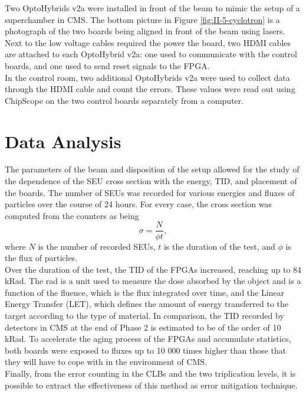     Two OptoHybrids v2a were installed in front of the beam to mimic the setup of a superchamber in CMS. The bottom picture in Figure \ref{fig:II-5-cyclotron} is a photograph of the two boards being aligned in front of the beam using lasers. Next to the low voltage cables required the power the board, two HDMI cables are attached to each OptoHybrid v2a: one used to communicate with the control boards, and one used to send reset signals to the FPGA. \\

    In the control room, two additional OptoHybrids v2a were used to collect data through the HDMI cable and count the errors. These values were read out using ChipScope on the two control boards separately from a computer.

  \section{Data Analysis}

    The parameters of the beam and disposition of the setup allowed for the study of the dependence of the SEU cross section with the energy, TID, and placement of the boards. The number of SEUs was recorded for various energies and fluxes of particles over the course of 24 hours. For every case, the cross section was computed from the counters as being
    \begin{equation}
        \sigma = \frac{N}{\phi t} ,
    \end{equation}
    where $ N $ is the number of recorded SEUs, $ t $ is the duration of the test, and $ \phi $ is the flux of particles. \\

    Over the duration of the test, the TID of the FPGAs increased, reaching up to 84 kRad. The rad is a unit used to measure the dose absorbed by the object and is a function of the fluence, which is the flux integrated over time, and the Linear Energy Transfer (LET), which defines the amount of energy transferred to the target according to the type of material. In comparison, the TID recorded by detectors in CMS at the end of Phase 2 is estimated to be of the order of 10 kRad. To accelerate the aging process of the FPGAs and accumulate statistics, both boards were exposed to fluxes up to 10 000 times higher than those that they will have to cope with in the environment of CMS. \\

    Finally, from the error counting in the CLBs and the two triplication levels, it is possible to extract the effectiveness of this method as error mitigation technique.

